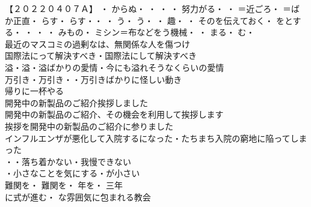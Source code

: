 【２０２２０４０７Ａ】
・
からぬ・
・
・
・
努力がる・
・
＝近ごろ・
＝ばか正直・
らす・
らす・・
・
う・
う・
・
趣・
・
そのを伝えておく・
をとする・
・
・
・
みもの・
ミシン＝布などをう機械・
・
まる・
む・
\\

最近のマスコミの過剰なは、無関係な人を傷つけ\\
国際法にって解決すべき・国際法にして解決すべき\\

溢・溢・溢ばかりの愛情・今にも溢れそうなくらいの愛情\\
万引き・万引き・・万引きばかりに怪しい動き\\

帰りに一杯やる\\
開発中の新製品のご紹介挨拶しました\\
開発中の新製品のご紹介、その機会を利用して挨拶します\\
挨拶を開発中の新製品のご紹介に参りました\\
インフルエンザが悪化して入院するになった・たちまち入院の窮地に陥ってしまった\\

・・落ち着かない・我慢できない\\
・小さなことを気にする・が小さい\\
難関を・
難関を・
年を・
三年\\
に式が進む・
な雰囲気に包まれる教会\\

